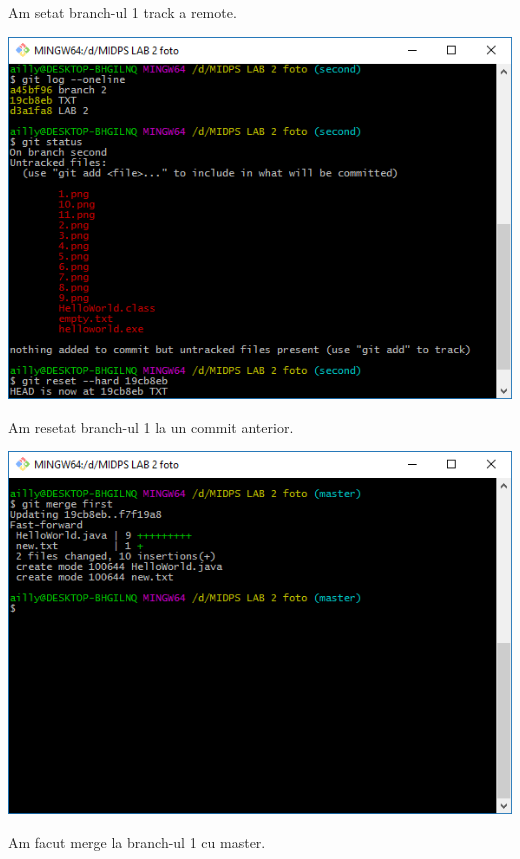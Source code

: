 Am setat branch-ul 1 track a remote.\\
\begin{center}
\includegraphics[scale=0.75]{images/12}\\
\end{center}

Am resetat branch-ul 1 la un commit anterior.\\
\begin{center}
\includegraphics[scale=0.75]{images/13}\\
\end{center}

Am facut merge la branch-ul 1 cu master.\\
\begin{center}

\end{center}

